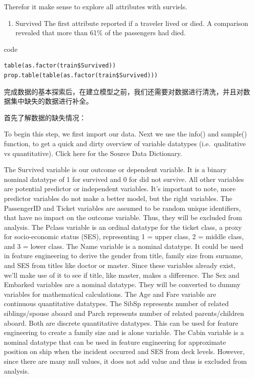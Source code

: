 \documentclass[
]{book}
\providecommand{\tightlist}{%
  \setlength{\itemsep}{0pt}\setlength{\parskip}{0pt}}
\begin{document}
Therefor it make sense to explore all attributes with surviels.

\begin{enumerate}
\def\labelenumi{\arabic{enumi}.}
\tightlist
\item
  Survived
  The first attribute reported if a traveler lived or died. A comparison revealed that more than 61\% of the passengers had died.
\end{enumerate}

code

\begin{verbatim}
table(as.factor(train$Survived))
prop.table(table(as.factor(train$Survived)))
\end{verbatim}

完成数据的基本探索后，在建立模型之前，我们还需要对数据进行清洗，并且对数据集中缺失的数据进行补全。

首先了解数据的缺失情况：

To begin this step, we first import our data. Next we use the info() and sample() function, to get a quick and dirty overview of variable datatypes (i.e.~qualitative vs quantitative). Click here for the Source Data Dictionary.

The Survived variable is our outcome or dependent variable. It is a binary nominal datatype of 1 for survived and 0 for did not survive. All other variables are potential predictor or independent variables. It's important to note, more predictor variables do not make a better model, but the right variables.
The PassengerID and Ticket variables are assumed to be random unique identifiers, that have no impact on the outcome variable. Thus, they will be excluded from analysis.
The Pclass variable is an ordinal datatype for the ticket class, a proxy for socio-economic status (SES), representing 1 = upper class, 2 = middle class, and 3 = lower class.
The Name variable is a nominal datatype. It could be used in feature engineering to derive the gender from title, family size from surname, and SES from titles like doctor or master. Since these variables already exist, we'll make use of it to see if title, like master, makes a difference.
The Sex and Embarked variables are a nominal datatype. They will be converted to dummy variables for mathematical calculations.
The Age and Fare variable are continuous quantitative datatypes.
The SibSp represents number of related siblings/spouse aboard and Parch represents number of related parents/children aboard. Both are discrete quantitative datatypes. This can be used for feature engineering to create a family size and is alone variable.
The Cabin variable is a nominal datatype that can be used in feature engineering for approximate position on ship when the incident occurred and SES from deck levels. However, since there are many null values, it does not add value and thus is excluded from analysis.
\end{document}
